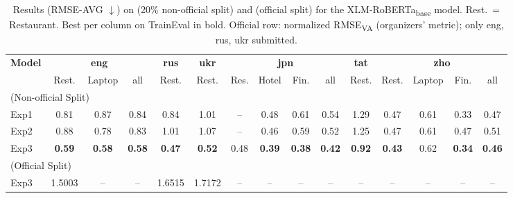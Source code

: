 \begin{table}[h]
    \centering
    \footnotesize
    \setlength{\tabcolsep}{2.8pt}
    \renewcommand{\arraystretch}{1.05}
    \begin{tabular}{l|ccc|c|c|cccc|c|cccc}
    \toprule
    \multirow{2}{*}{\textbf{Model}} &
    \multicolumn{3}{c|}{\textbf{eng}} &
    \textbf{rus} &
    \textbf{ukr} &
    \multicolumn{4}{c|}{\textbf{jpn}} &
    \textbf{tat} &
    \multicolumn{4}{c}{\textbf{zho}} \\
    \cline{2-15}
    & Rest. & Laptop & all & Rest. & Rest. & Res. & Hotel & Fin. & all & Rest. & Rest. & Laptop & Fin. & all \\
    \midrule
    \multicolumn{15}{l}{\dimabsaTrainEval{} (Non-official Split)} \\
    \midrule
    Exp1 & 0.81 & 0.87 & 0.84 & 0.84 & 1.01 & -- & 0.48 & 0.61 & 0.54 & 1.29 & 0.47 & 0.61 & 0.33 & 0.47 \\
    Exp2 & 0.88 & 0.78 & 0.83 & 1.01 & 1.07 & -- & 0.46 & 0.59 & 0.52 & 1.25 & 0.47 & 0.61 & 0.47 & 0.51 \\
    Exp3 & \textbf{0.59} & \textbf{0.58} & \textbf{0.58} & \textbf{0.47} & \textbf{0.52} & 0.48 & \textbf{0.39} & \textbf{0.38} & \textbf{0.42} & \textbf{0.92} & \textbf{0.43} & 0.62 & \textbf{0.34} & \textbf{0.46} \\
    \midrule
    \multicolumn{15}{l}{\dimabsaTest{} (Official Split)} \\
    \midrule
    Exp3 & 1.5003 & -- & -- & 1.6515 & 1.7172 & -- & -- & -- & -- & -- & -- & -- & -- & -- \\
    \bottomrule
    \end{tabular}
    \caption{Results (RMSE-AVG $\downarrow$) on \dimabsaTrainEval{} (20\% non-official split) and \dimabsaTest{} (official split) for the XLM-RoBERTa\textsubscript{base} model. Rest.\ = Restaurant. Best per column on TrainEval in bold. Official row: normalized RMSE\textsubscript{VA} (organizers' metric); only eng, rus, ukr submitted.}
    \label{tab:results}
\end{table}
